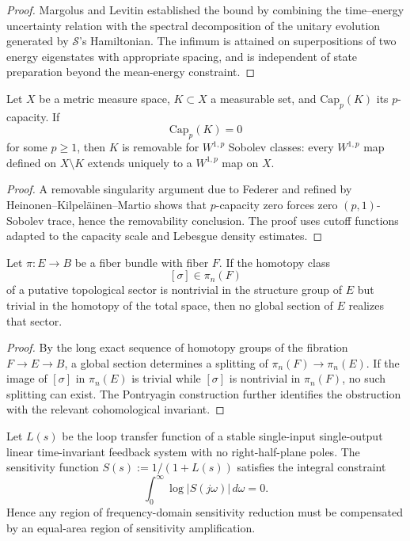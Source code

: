 \begin{proof}
Margolus and Levitin established the bound by combining the time--energy uncertainty relation with the spectral decomposition of the unitary evolution generated by $\mathcal S$'s Hamiltonian. The infimum is attained on superpositions of two energy eigenstates with appropriate spacing, and is independent of state preparation beyond the mean-energy constraint.
\end{proof}

\begin{theorem}\label{thm-capacity-barrier}
Let $X$ be a metric measure space, $K \subset X$ a measurable set, and $\mathrm{Cap}_p(K)$ its $p$-capacity. If
\[
\mathrm{Cap}_p(K) = 0
\]
for some $p \ge 1$, then $K$ is removable for $W^{1,p}$ Sobolev classes: every $W^{1,p}$ map defined on $X \setminus K$ extends uniquely to a $W^{1,p}$ map on $X$.
\end{theorem}

\begin{proof}
A removable singularity argument due to Federer and refined by Heinonen--Kilpel\"ainen--Martio shows that $p$-capacity zero forces zero $(p,1)$-Sobolev trace, hence the removability conclusion. The proof uses cutoff functions adapted to the capacity scale and Lebesgue density estimates.
\end{proof}

\begin{theorem}\label{thm-topological-sector}
Let $\pi : E \to B$ be a fiber bundle with fiber $F$. If the homotopy class
\[
[\sigma] \in \pi_n(F)
\]
of a putative topological sector is nontrivial in the structure group of $E$ but trivial in the homotopy of the total space, then no global section of $E$ realizes that sector.
\end{theorem}

\begin{proof}
By the long exact sequence of homotopy groups of the fibration $F \to E \to B$, a global section determines a splitting of $\pi_n(F) \to \pi_n(E)$. If the image of $[\sigma]$ in $\pi_n(E)$ is trivial while $[\sigma]$ is nontrivial in $\pi_n(F)$, no such splitting can exist. The Pontryagin construction further identifies the obstruction with the relevant cohomological invariant.
\end{proof}

\begin{theorem}\label{thm-bode-sensitivity}
Let $L(s)$ be the loop transfer function of a stable single-input single-output linear time-invariant feedback system with no right-half-plane poles. The sensitivity function $S(s) := 1/(1 + L(s))$ satisfies the integral constraint
\[
\int_0^\infty \log |S(j\omega)|\, d\omega = 0.
\]
Hence any region of frequency-domain sensitivity reduction must be compensated by an equal-area region of sensitivity amplification.
\end{theorem}

